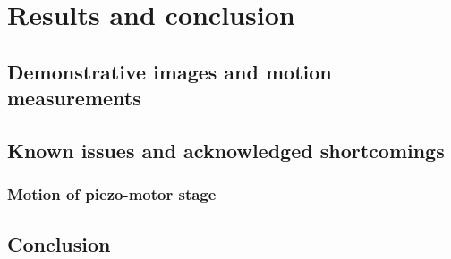 \chapter{Results and conclusion}

\section{Demonstrative images and motion measurements}

\section{Known issues and acknowledged shortcomings}

\subsection{Motion of piezo-motor stage}

\section{Conclusion}